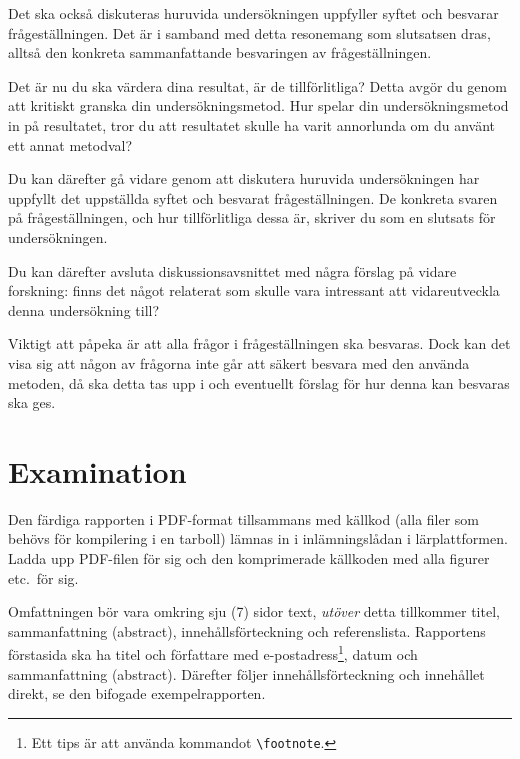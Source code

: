 \documentclass[a4paper,nocourse]{miunasgn}
\begin{document}
Det ska också diskuteras huruvida undersökningen uppfyller syftet och besvarar 
frågeställningen.
Det är i samband med detta resonemang som slutsatsen dras, alltså den konkreta 
sammanfattande besvaringen av frågeställningen.

Det är nu du ska värdera dina resultat, är de tillförlitliga?
Detta avgör du genom att kritiskt granska din undersökningsmetod.
Hur spelar din undersökningsmetod in på resultatet, tror du att resultatet 
skulle ha varit annorlunda om du använt ett annat metodval?

Du kan därefter gå vidare genom att diskutera huruvida undersökningen har 
uppfyllt det uppställda syftet och besvarat frågeställningen.
De konkreta svaren på frågeställningen, och hur tillförlitliga dessa är, 
skriver du som en slutsats för undersökningen.

Du kan därefter avsluta diskussionsavsnittet med några förslag på vidare 
forskning: finns det något relaterat som skulle vara intressant att 
vidareutveckla denna undersökning till?

Viktigt att påpeka är att alla frågor i frågeställningen ska besvaras.
Dock kan det visa sig att någon av frågorna inte går att säkert besvara med den 
använda metoden, då ska detta tas upp i och eventuellt förslag för hur denna 
kan besvaras ska ges.


\section{Examination}

Den färdiga rapporten i PDF-format tillsammans med källkod (alla filer som 
behövs för kompilering i en tarboll) lämnas in i inlämningslådan 
i lärplattformen.
Ladda upp PDF-filen för sig och den komprimerade källkoden med alla figurer 
etc.\ för sig.

Omfattningen bör vara omkring sju (7) sidor text, \emph{utöver} detta 
tillkommer titel, sammanfattning (abstract), innehållsförteckning och 
referenslista.
Rapportens förstasida ska ha titel och författare med e-postadress\footnote{%
  Ett tips är att använda kommandot \texttt{\textbackslash footnote}.
}, datum och sammanfattning (abstract).
Därefter följer innehållsförteckning och innehållet direkt, se den bifogade 
exempelrapporten.
\end{document}
